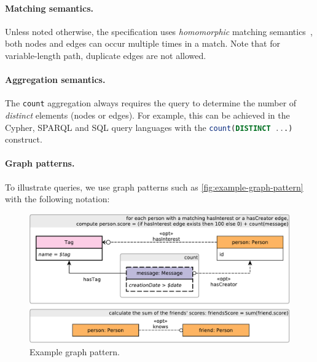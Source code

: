 \paragraph{Matching semantics.}

Unless noted otherwise, the specification uses \emph{homomorphic} matching 
semantics~\cite{DBLP:journals/csur/AnglesABHRV17}, \ie both nodes and edges can 
occur multiple times in a match. Note that for variable-length path, duplicate 
edges are not allowed.

\paragraph{Aggregation semantics.}

The \lstinline{count} aggregation always requires the query to determine the number of \emph{distinct} elements (nodes or edges). For example, this can be achieved in the Cypher, SPARQL and SQL query languages with the \lstinline[language=sql]{count(DISTINCT ...)} construct.

\paragraph{Graph patterns.}

To illustrate queries, we use graph patterns such as \autoref{fig:example-graph-pattern} with the following notation:

\begin{figure}[ht]
	\begin{center}
		\includegraphics[scale=\patternscale,margin=0cm .2cm]{patterns/bi-read-08}
		\caption{Example graph pattern.}
		\label{fig:example-graph-pattern}
	\end{center}
\end{figure}

